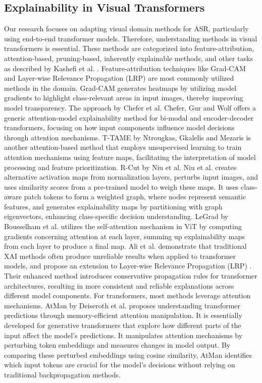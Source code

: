 \documentclass[../report.tex]{subfiles}
\begin{document}
    \subsection{Explainability in Visual Transformers}
    Our research focuses on adapting visual domain methods for ASR, particularly using end-to-end transformer models. Therefore, understanding methods in visual transformers is essential. These methods are categorized into feature-attribution, attention-based, pruning-based, inherently explainable methods, and other tasks as described by Kashefi et al. \cite{kashefi2023explainability}. Feature-attribution techniques like Grad-CAM \cite{Selvaraju_2019} and Layer-wise Relevance Propagation (LRP) \cite{bach2015pixel} are most commonly utilized methods in the domain. Grad-CAM generates heatmaps by utilizing model gradients to highlight class-relevant areas in input images, thereby improving model transparency. The approach by Chefer et al. Chefer, Gur and Wolf \cite{9710570} offers a generic attention-model explainability method for bi-modal and encoder-decoder transformers, focusing on how input components influence model decisions through attention mechanisms. T-TAME by Ntrougkas, Gkalelis and Mezaris \cite{10539635} is another attention-based method that employs unsupervised learning to train attention mechanisms using feature maps, facilitating the interpretation of model processing and feature prioritization. R-Cut by Niu et al. Niu et al. \cite{niu2024r} creates alternative activation maps from normalization layers, perturbs input images, and uses similarity scores from a pre-trained model to weigh these maps. It uses class-aware patch tokens to form a weighted graph, where nodes represent semantic features, and generates explainability maps by partitioning with graph eigenvectors, enhancing class-specific decision understanding. LeGrad by Bousselham et al. \cite{bousselham2024legrad} utilizes the self-attention mechanism in ViT \cite{dosovitskiy2020image} by computing gradients concerning attention at each layer, summing up explainability maps from each layer to produce a final map.
    Ali et al. \cite{pmlr-v162-ali22a} demonstrate that traditional XAI methods often produce unreliable results when applied to transformer models, and propose an extension to Layer-wise Relevance Propagation (LRP) \cite{bach2015pixel}. Their enhanced method introduces conservative propagation rules for transformer architectures, resulting in more consistent and reliable explanations across different model components.
    For transformers, most methods leverage attention mechanisms. AtMan by Deiseroth et al. \cite{NEURIPS2023_c83bc020} proposes understanding transformer predictions through memory-efficient attention manipulation.
    It is essentially developed for generative transformers that explore how different parts of the input affect the model's predictions. 
    It manipulates attention mechanisms by perturbing token embeddings and measures changes in model output. By comparing these perturbed embeddings using cosine similarity, AtMan \cite{NEURIPS2023_c83bc020} identifies which input tokens are crucial for the model's decisions without relying on traditional backpropagation methods. 
\end{document}
